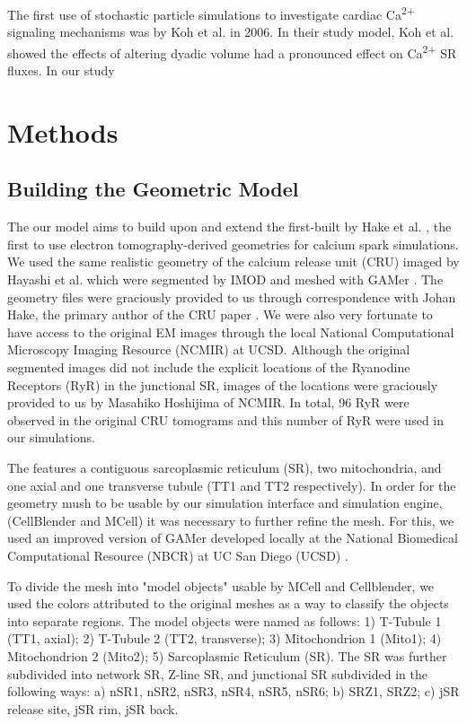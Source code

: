 \documentclass[12pt]{ucsddissertation}
\begin{document}
The first use of stochastic particle simulations to investigate cardiac Ca\textsuperscript{2+} signaling mechanisms was by Koh et al. in 2006\cite{Koh2006}. In their study model, Koh et al. showed the effects of altering dyadic volume had a pronounced effect on Ca\textsuperscript{2+} SR fluxes. In our study


 \section{Methods}
 
 \subsection{Building the Geometric Model}
 
 The our model aims to build upon and extend the first-built by Hake et al. \cite{Hake2012}, the first to use electron tomography-derived geometries for calcium spark simulations. We used the same realistic geometry of the calcium release unit (CRU) imaged by Hayashi et al. \cite{Hayashi2009} which were segmented by IMOD \cite{Mastronarde2008} and meshed with GAMer \cite{Yu2008}. The geometry files were graciously provided to us through correspondence with Johan Hake, the primary author of the CRU paper \cite{Hake2012}. We were also very fortunate to have access to the original EM images through the local National Computational Microscopy Imaging Resource (NCMIR) at UCSD. Although the original segmented images did not include the explicit locations of the Ryanodine Receptors (RyR) in the junctional SR, images of the locations were graciously provided to us by Masahiko Hoshijima of NCMIR. In total, 96 RyR were observed in the original CRU tomograms and this number of RyR were used in our simulations.
 
The features a contiguous sarcoplasmic reticulum (SR), two mitochondria, and one axial and one transverse tubule (TT1 and TT2 respectively). In order for the geometry mush to be usable by our simulation interface and simulation engine, (CellBlender and MCell) it was necessary to further refine the mesh. For this, we used an improved version of GAMer developed locally at the National Biomedical Computational Resource (NBCR) at UC San Diego (UCSD) \cite{Yu2008,Lee2018}.

To divide the mesh into "model objects" usable by MCell and Cellblender, we used the colors attributed to the original meshes as a way to classify the objects into separate regions. The model objects were named as follows: 1) T-Tubule 1 (TT1, axial); 2) T-Tubule 2 (TT2, transverse); 3) Mitochondrion 1 (Mito1); 4) Mitochondrion 2 (Mito2); 5) Sarcoplasmic Reticulum (SR). The SR was further subdivided into network SR, Z-line SR, and junctional SR subdivided in the following ways: a) nSR1, nSR2, nSR3, nSR4, nSR5, nSR6; b) SRZ1, SRZ2; c) jSR release site, jSR rim, jSR back.
\end{document}
